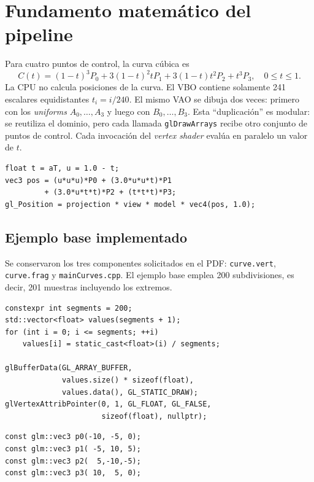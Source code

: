 \documentclass[12pt,a4paper]{article}
\begin{document}
\section{Fundamento matemático del pipeline}
Para cuatro puntos de control, la curva cúbica es
\[
C(t)=(1-t)^3P_0+3(1-t)^2tP_1+3(1-t)t^2P_2+t^3P_3,\quad 0\le t\le1.
\]
La CPU no calcula posiciones de la curva. El VBO contiene solamente 241
escalares equidistantes $t_i=i/240$. El mismo VAO se dibuja dos veces: primero
con los \textit{uniforms} $A_0,\ldots,A_3$ y luego con $B_0,\ldots,B_3$.
Esta ``duplicación'' es modular: se reutiliza el dominio, pero cada llamada
\texttt{glDrawArrays} recibe otro conjunto de puntos de control. Cada invocación
del \textit{vertex shader} evalúa en paralelo un valor de $t$.

\begin{lstlisting}[style=cxx,caption={Evaluación de Bernstein en el vertex shader.}]
float t = aT, u = 1.0 - t;
vec3 pos = (u*u*u)*P0 + (3.0*u*u*t)*P1
         + (3.0*u*t*t)*P2 + (t*t*t)*P3;
gl_Position = projection * view * model * vec4(pos, 1.0);
\end{lstlisting}

\subsection{Ejemplo base implementado}
Se conservaron los tres componentes solicitados en el PDF:
\texttt{curve.vert}, \texttt{curve.frag} y \texttt{mainCurves.cpp}. El ejemplo
base emplea 200 subdivisiones, es decir, 201 muestras incluyendo los extremos.

\begin{lstlisting}[style=cxx,caption={Inicialización semántica del atributo escalar \(t\).}]
constexpr int segments = 200;
std::vector<float> values(segments + 1);
for (int i = 0; i <= segments; ++i)
    values[i] = static_cast<float>(i) / segments;

glBufferData(GL_ARRAY_BUFFER,
             values.size() * sizeof(float),
             values.data(), GL_STATIC_DRAW);
glVertexAttribPointer(0, 1, GL_FLOAT, GL_FALSE,
                      sizeof(float), nullptr);
\end{lstlisting}

\begin{lstlisting}[style=cxx,caption={Puntos de control del ejemplo base del PDF.}]
const glm::vec3 p0(-10, -5, 0);
const glm::vec3 p1( -5, 10, 5);
const glm::vec3 p2(  5,-10,-5);
const glm::vec3 p3( 10,  5, 0);
\end{lstlisting}
\end{document}
